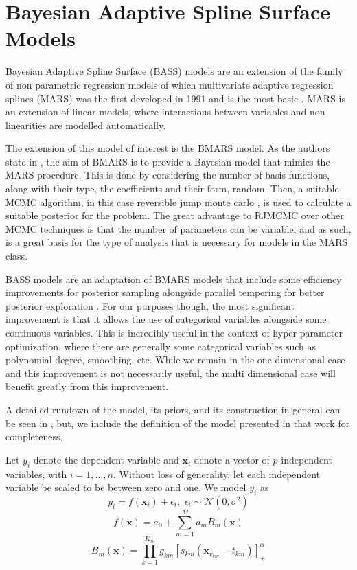 \documentclass[%
 aip,
 amsmath,amssymb,
 reprint,%
]{revtex4-1}
\begin{document}
\section{Bayesian Adaptive Spline Surface Models}

Bayesian Adaptive Spline Surface (BASS) models are an extension of the family of non parametric regression models of which multivariate adaptive regression splines (MARS) was the first developed in 1991 and is the most basic \cite{friedman1991multivariate}. MARS is an extension of linear models, where interactions between variables and non linearities are modelled automatically. 

The extension of this model of interest is the BMARS model. As the authors state in \cite{denison1998bayesian}, the aim of BMARS is to provide a Bayesian model that mimics the MARS procedure. This is done by considering the number of basis functions, along with their type, the coefficients and their form, random. Then, a suitable MCMC algorithm, in this case reversible jump monte carlo \cite{green1995reversible}, is used to calculate a suitable posterior for the problem. The great advantage to RJMCMC over other MCMC techniques is that the number of parameters can be variable, and as such, is a great basis for the type of analysis that is necessary for models in the MARS class. 

BASS models are an adaptation of BMARS models that include some efficiency improvements for posterior sampling alongside parallel tempering for better posterior exploration \cite{francom2020bass}. For our purposes though, the most significant improvement is that it allows the use of categorical variables alongside some continuous variables. This is incredibly useful in the context of hyper-parameter optimization, where there are generally some categorical variables such as polynomial degree, smoothing, etc. While we remain in the one dimensional case and this improvement is not necessarily useful, the multi dimensional case will benefit greatly from this improvement. 

A detailed rundown of the model, its priors, and its construction in general can be seen in \cite{francom2020bass}, but, we include the definition of the model presented in that work for completeness. 

Let $y_i$ denote the dependent variable and $\boldsymbol{x}_i$ denote a vector of $p$ independent variables, with $i = 1, \ldots, n$. Without loss of generality, let each independent variable be scaled to be between
zero and one. We model $y_i$ as 
\[ y_i = f(\boldsymbol{x}_i) + \epsilon_i, \, \, \epsilon_i \sim \mathcal{N}(0,\sigma^2) \]
\[ f(\boldsymbol{x}) = a_0 + \sum_{m=1}^{M} a_m B_m(\boldsymbol{x}) \]
\[ B_m(\boldsymbol{x}) = \prod_{k=1}^{K_m} g_{km} [s_{km}(\boldsymbol{x}_{v_{km}} - t_{km}) ]^\alpha_+ \]
\end{document}
